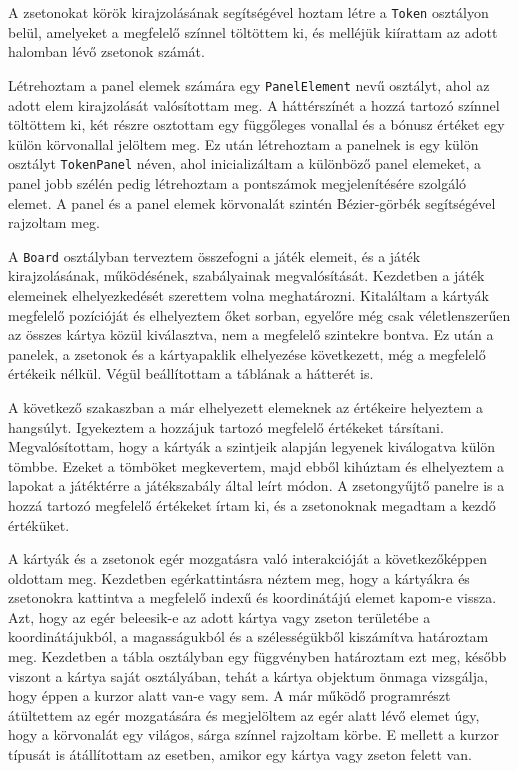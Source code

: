 
A zsetonokat körök kirajzolásának segítségével hoztam létre a \texttt{Token} osztályon belül, amelyeket a megfelelő színnel töltöttem ki, és melléjük kiírattam az adott halomban lévő zsetonok számát.


Létrehoztam a panel elemek számára egy \texttt{PanelElement} nevű osztályt, ahol az adott elem kirajzolását valósítottam meg. A háttérszínét a hozzá tartozó színnel töltöttem ki, két részre osztottam egy függőleges vonallal és a bónusz értéket egy külön körvonallal jelöltem meg. Ez után létrehoztam a panelnek is egy külön osztályt \texttt{TokenPanel} néven, ahol inicializáltam a különböző panel elemeket, a panel jobb szélén pedig létrehoztam a pontszámok megjelenítésére szolgáló elemet. A panel és a panel elemek körvonalát szintén Bézier-görbék segítségével rajzoltam meg.


A \texttt{Board} osztályban terveztem összefogni a játék elemeit, és a játék kirajzolásának, működésének, szabályainak megvalósítását. Kezdetben a játék elemeinek elhelyezkedését szerettem volna meghatározni. Kitaláltam a kártyák megfelelő pozícióját és elhelyeztem őket sorban, egyelőre még csak véletlenszerűen az összes kártya közül kiválasztva, nem a megfelelő szintekre bontva. Ez után a panelek, a zsetonok és a kártyapaklik elhelyezése következett, még a megfelelő értékeik nélkül. Végül beállítottam a táblának a hátterét is.

A következő szakaszban a már elhelyezett elemeknek az értékeire helyeztem a hangsúlyt. Igyekeztem a hozzájuk tartozó megfelelő értékeket társítani. Megvalósítottam, hogy a kártyák a szintjeik alapján legyenek kiválogatva külön tömbbe. Ezeket a tömböket megkevertem, majd ebből kihúztam és elhelyeztem a lapokat a játéktérre a játékszabály által leírt módon. A zsetongyűjtő panelre is a hozzá tartozó megfelelő értékeket írtam ki, és a zsetonoknak megadtam a kezdő értéküket.


A kártyák és a zsetonok egér mozgatásra való interakcióját a következőképpen oldottam meg. Kezdetben egérkattintásra néztem meg, hogy a kártyákra és zsetonokra kattintva a megfelelő indexű és koordinátájú elemet kapom-e vissza. Azt, hogy az egér beleesik-e az adott kártya vagy zseton területébe a koordinátájukból, a magasságukból és a szélességükből kiszámítva határoztam meg. Kezdetben a tábla osztályban egy függvényben határoztam ezt meg, később viszont a kártya saját osztályában, tehát a kártya objektum önmaga vizsgálja, hogy éppen a kurzor alatt van-e vagy sem. A már működő programrészt átültettem az egér mozgatására és megjelöltem az egér alatt lévő elemet úgy, hogy a körvonalát egy világos, sárga színnel rajzoltam körbe. E mellett a kurzor típusát is átállítottam az esetben, amikor egy kártya vagy zseton felett van.

